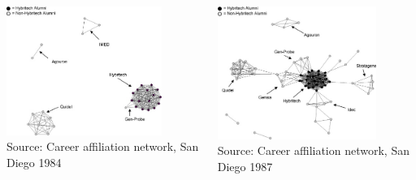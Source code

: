 \documentclass[8pt]{beamer}
\begin{document}
\begin{frame}[fragile]
\frametitle{\insertsection}
\framesubtitle{\insertsubsection}

\begin{columns}[c]

\centering
\includegraphics[width = 0.8\textwidth]{network_emergence_1}\\
\tiny Source: Career affiliation network, San Diego 1984 \cite{Casper2007}

\centering
\includegraphics[width = 0.8\textwidth]{network_emergence_2}\\
\tiny Source: Career affiliation network, San Diego 1987 \cite{Casper2007}


\end{columns}

\end{frame}
\end{document}
